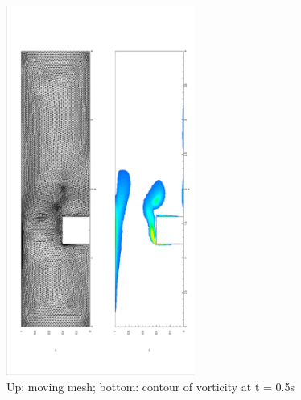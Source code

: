 \documentclass[a4paper, 11pt]{article}
\begin{document}
      \begin{figure}[!htbp]
        \centering
        \includegraphics[width = 0.55\textwidth, angle = -90]{picture/step_flow_data/mesh_t_05.eps}
        \caption{\small Up: moving mesh; bottom: contour of vorticity
          at t = 0.5s}
        \label{fig::step_flow_05s}
      \end{figure}
\end{document}
